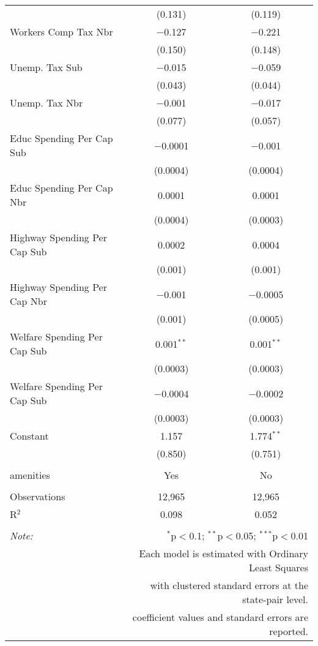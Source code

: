 \begin{table}[!htbp]
\begin{tabular}{@{\extracolsep{5pt}}lcc}
  & (0.131) & (0.119) \\ 
  Workers Comp Tax Nbr & $-$0.127 & $-$0.221 \\ 
  & (0.150) & (0.148) \\ 
  Unemp. Tax Sub & $-$0.015 & $-$0.059 \\ 
  & (0.043) & (0.044) \\ 
  Unemp. Tax Nbr & $-$0.001 & $-$0.017 \\ 
  & (0.077) & (0.057) \\ 
  Educ Spending Per Cap Sub & $-$0.0001 & $-$0.001 \\ 
  & (0.0004) & (0.0004) \\ 
  Educ Spending Per Cap Nbr & 0.0001 & 0.0001 \\ 
  & (0.0004) & (0.0003) \\ 
  Highway Spending Per Cap Sub & 0.0002 & 0.0004 \\ 
  & (0.001) & (0.001) \\ 
  Highway Spending Per Cap Nbr & $-$0.001 & $-$0.0005 \\ 
  & (0.001) & (0.0005) \\ 
  Welfare Spending Per Cap Sub & 0.001$^{**}$ & 0.001$^{**}$ \\ 
  & (0.0003) & (0.0003) \\ 
  Welfare Spending Per Cap Sub & $-$0.0004 & $-$0.0002 \\ 
  & (0.0003) & (0.0003) \\ 
  Constant & 1.157 & 1.774$^{**}$ \\ 
  & (0.850) & (0.751) \\ 
 \hline \\[-1.8ex] 
amenities & Yes & No \\ 
\hline \\[-1.8ex] 
Observations & 12,965 & 12,965 \\ 
R$^{2}$ & 0.098 & 0.052 \\ 
\hline 
\hline \\[-1.8ex] 
\textit{Note:}  & \multicolumn{2}{r}{$^{*}$p$<$0.1; $^{**}$p$<$0.05; $^{***}$p$<$0.01} \\ 
 & \multicolumn{2}{r}{Each model is estimated with Ordinary Least Squares} \\ 
 & \multicolumn{2}{r}{with clustered standard errors at the state-pair level.} \\ 
 & \multicolumn{2}{r}{coefficient values and standard errors are reported.} \\ 
\end{tabular} 
\end{table} 
